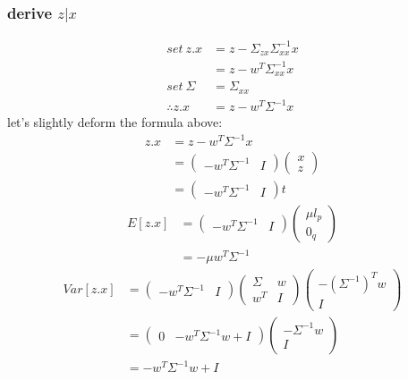 \documentclass{report}
\begin{document}
\subsubsection{derive $z|x$}
\begin{equation}
\begin{aligned}
set\ z.x &= z - \Sigma_{zx} \Sigma_{xx}^{-1} x\\
&= z - w^T \Sigma_{xx}^{-1} x\\
set\ \Sigma &= \Sigma_{xx} \\
\therefore 
z.x &= z - w^T \Sigma^{-1}x
\end{aligned}
\end{equation}
let's slightly deform the formula above:
\begin{equation}
\begin{aligned}
z.x &= z - w^T \Sigma^{-1}x\\
&=
\left (
\begin{matrix}
-w^T \Sigma^{-1} & I
\end{matrix}
\right )
\left (
\begin{matrix}
x\\z
\end{matrix}
\right )\\
&= \left (
\begin{matrix}
-w^T \Sigma^{-1} & I
\end{matrix}
\right )
t
\end{aligned}
\end{equation}
\begin{equation}
\begin{aligned}
E[z.x] &=
\left (
\begin{matrix}
-w^T \Sigma^{-1} & I
\end{matrix}
\right )
\left (
\begin{matrix}
\mu l_p \\ 0_q
\end{matrix}
\right )\\
&= -\mu w^T \Sigma^{-1}
\end{aligned}
\end{equation}
\begin{equation}
\begin{aligned}
Var[z.x] &=
\left (
\begin{matrix}
-w^T \Sigma^{-1} & I
\end{matrix}
\right )
\left (
\begin{matrix}
\Sigma & w\\
w^T & I
\end{matrix}
\right )
\left (
\begin{matrix}
-(\Sigma^{-1})^T w \\ I
\end{matrix}
\right )\\
&= 
\left (
\begin{matrix}
0 & -w^T \Sigma^{-1}w + I
\end{matrix}
\right )
\left (
\begin{matrix}
- \Sigma^{-1} w\\ I
\end{matrix}
\right )\\
&= -w^T \Sigma^{-1}w + I
\end{aligned}
\end{equation}\\
\end{document}
